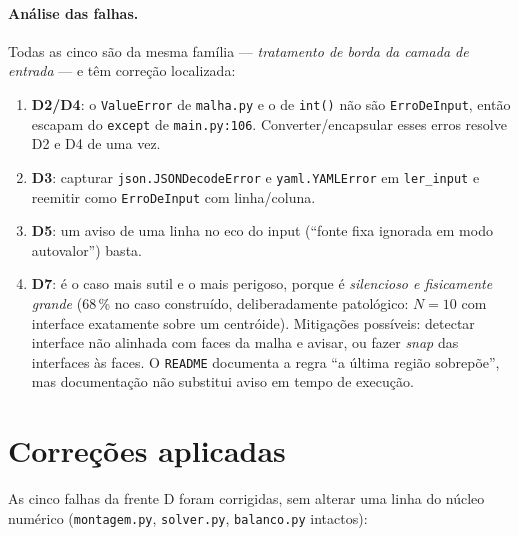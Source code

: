 \documentclass[11pt,a4paper]{article}
\begin{document}
\paragraph{Análise das falhas.} Todas as cinco são da mesma família ---
\emph{tratamento de borda da camada de entrada} --- e têm correção localizada:
\begin{enumerate}
  \item \textbf{D2/D4}: o \texttt{ValueError} de \texttt{malha.py} e o de
        \texttt{int()} não são \texttt{ErroDeInput}, então escapam do
        \texttt{except} de \texttt{main.py:106}. Converter/encapsular esses
        erros resolve D2 e D4 de uma vez.
  \item \textbf{D3}: capturar \texttt{json.JSONDecodeError} e
        \texttt{yaml.YAMLError} em \texttt{ler\_input} e reemitir como
        \texttt{ErroDeInput} com linha/coluna.
  \item \textbf{D5}: um aviso de uma linha no eco do input
        (``fonte fixa ignorada em modo autovalor'') basta.
  \item \textbf{D7}: é o caso mais sutil e o mais perigoso, porque é
        \emph{silencioso e fisicamente grande} (68\,\% no caso construído,
        deliberadamente patológico: $N=10$ com interface exatamente sobre um
        centróide). Mitigações possíveis: detectar interface não alinhada com
        faces da malha e avisar, ou fazer \emph{snap} das interfaces às faces.
        O \texttt{README} documenta a regra ``a última região sobrepõe'', mas
        documentação não substitui aviso em tempo de execução.
\end{enumerate}

\section{Correções aplicadas}
\label{sec:correcoes}

As cinco falhas da frente D foram corrigidas, sem alterar uma linha do núcleo
numérico (\texttt{montagem.py}, \texttt{solver.py}, \texttt{balanco.py}
intactos):
\end{document}
